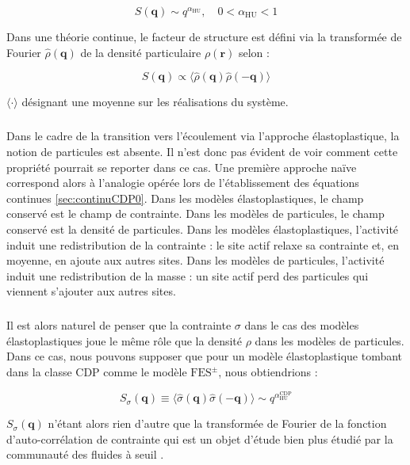 \begin{equation}
	S(\mathbf{q})\sim q^{\alpha_\text{HU}}, \quad 0<\alpha_\text{HU}<1
\end{equation}

\noindent Dans une théorie continue, le facteur de structure est défini via la transformée de Fourier $\hat{\rho}(\mathbf{q})$ de la densité particulaire $\rho(\mathbf{r})$ selon :

\begin{equation}
	S(\mathbf{q}) \propto  \langle \hat{\rho}(\mathbf{q})\hat{\rho}(\mathbf{-q}) \rangle
\end{equation}

\noindent $\langle \cdot \rangle$ désignant une moyenne sur les réalisations du système.

\subparagraph{}Dans le cadre de la transition vers l'écoulement via l'approche élastoplastique, la notion de particules est absente. Il n'est donc pas évident de voir comment cette propriété pourrait se reporter dans ce cas. Une première approche naïve correspond alors à l'analogie opérée lors de l'établissement des équations continues \autoref{sec:continuCDP0}. Dans les modèles élastoplastiques, le champ conservé est le champ de contrainte. Dans les modèles de particules, le champ conservé est la densité de particules. Dans les modèles élastoplastiques, l'activité induit une redistribution de la contrainte : le site actif relaxe sa contrainte et, en moyenne, en ajoute aux autres sites. Dans les modèles de particules, l'activité induit une redistribution de la masse : un site actif perd des particules qui viennent s'ajouter aux autres sites.

\subparagraph{}Il est alors naturel de penser que la contrainte $\sigma$ dans le cas des modèles élastoplastiques joue le même rôle que la densité $\rho$ dans les modèles de particules. Dans ce cas, nous pouvons supposer que pour un modèle élastoplastique tombant dans la classe CDP comme le modèle $\text{FES}^\pm$, nous obtiendrions :

\begin{equation}
	S_\sigma(\mathbf{q}) \equiv \langle\hat{\sigma}(\mathbf{q})\hat{\sigma}(\mathbf{-q})\rangle \sim q^{\alpha_\text{HU}^\text{CDP}}
\end{equation}

\noindent $S_\sigma(\mathbf{q})$ n'étant alors rien d'autre que la transformée de Fourier de la fonction d'auto-corrélation de contrainte qui est un objet d'étude bien plus étudié par la communauté des fluides à seuil \cite{chowdhury_long_2016, maier_emergence_2017, lerner_simple_2020}.

